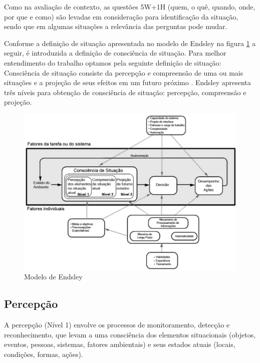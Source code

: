 \documentclass[12pt,a4paper,compsoc]{IEEEtran}
\begin{document}
  Como na  avaliação de contexto, as questões 5W+1H (quem, o quê, quando, onde, por que e como) são
  levadas em consideração para identificação da situação, sendo que em algumas situações a 
  relevância das perguntas pode mudar.
  
  Conforme a definição de situação apresentada no modelo de Endsley na figura \ref{modelo-endsley} a
  seguir, é introduzida a definição de consciência de situação. Para melhor entendimento do trabalho
  optamos pela seguinte definição de situação: Consciência de situação consiste da percepção e
  compreensão de uma ou mais situações e a projeção de seus efeitos em um futuro próximo
  \cite{endsley1995}. Endsley apresenta três níveis para obtenção de consciência de situação:
  percepção, compreensão e projeção.

  \begin{figure}[ht]
    \centerline{\includegraphics[scale=.35]{imagens/modelo-endsley}}
    \caption{Modelo de Endsley \cite{endsley1995}}
    \label{modelo-endsley}
  \end{figure}

\subsection{Percepção}

  A percepção (Nível 1)  envolve os processos de monitoramento, detecção e reconhecimento, que
  levam a uma consciência dos elementos situacionais (objetos, eventos, pessoas, sistemas, fatores
  ambientais) e seus estados atuais (locais, condições, formas, ações).
\end{document}
